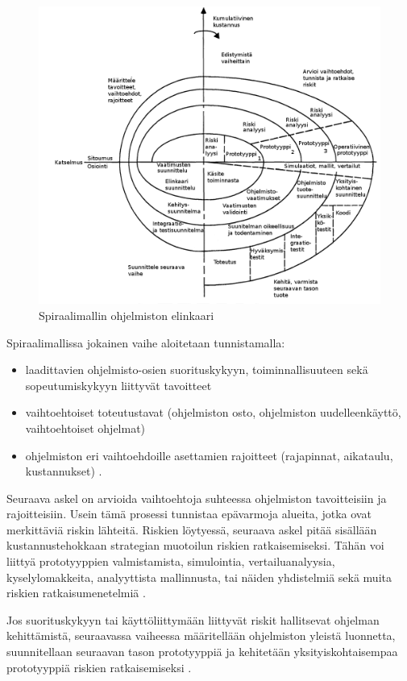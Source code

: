 \documentclass[finnish]{tktltiki2}
\theoremstyle{definition}
\theoremstyle{remark}
\begin{document}
\begin{figure}[h!]
  \caption{Spiraalimallin ohjelmiston elinkaari}
  \centering
    \includegraphics[width=\textwidth]{spiral}
\end{figure}

Spiraalimallissa jokainen vaihe aloitetaan tunnistamalla:
\begin{itemize}
  \item laadittavien ohjelmisto-osien suorituskykyyn, toiminnallisuuteen sekä sopeutumiskykyyn liittyvät tavoitteet
  \item vaihtoehtoiset toteutustavat (ohjelmiston osto, ohjelmiston uudelleenkäyttö, vaihtoehtoiset ohjelmat)
  \item ohjelmiston eri vaihtoehdoille asettamien rajoitteet (rajapinnat, aikataulu, kustannukset) \cite{BOE88}.
\end{itemize}

Seuraava askel on arvioida vaihtoehtoja suhteessa ohjelmiston tavoitteisiin ja rajoitteisiin. Usein tämä prosessi tunnistaa epävarmoja alueita, jotka ovat merkittäviä riskin lähteitä. Riskien löytyessä, seuraava askel pitää sisällään kustannustehokkaan strategian muotoilun riskien ratkaisemiseksi. Tähän voi liittyä prototyyppien valmistamista, simulointia, vertailuanalyysia, kyselylomakkeita, analyyttista mallinnusta, tai näiden yhdistelmiä sekä muita riskien ratkaisumenetelmiä \cite{BOE88}.

Jos suorituskykyyn tai käyttöliittymään liittyvät riskit hallitsevat ohjelman kehittämistä, seuraavassa vaiheessa määritellään ohjelmiston yleistä luonnetta, suunnitellaan seuraavan tason prototyyppiä ja kehitetään yksityiskohtaisempaa prototyyppiä riskien ratkaisemiseksi \cite{BOE88}.
\end{document}
